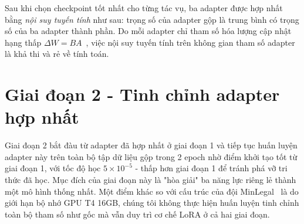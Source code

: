 Sau khi chọn checkpoint tốt nhất cho từng tác vụ, ba adapter được hợp nhất bằng \emph{nội suy tuyến tính} như sau: trọng số của adapter gộp là trung bình có trọng số của ba adapter thành phần. Do mỗi adapter chỉ tham số hóa lượng cập nhật hạng thấp $\Delta W = BA$~\cite{hu2022lora}, việc nội suy tuyến tính trên không gian tham số adapter là khả thi và rẻ về tính toán.

\section{Giai đoạn 2 - Tinh chỉnh adapter hợp nhất}

Giai đoạn 2 bắt đàu từ adapter đã hợp nhất ở giai đoạn 1 và tiếp tục huấn luyện adapter này trên toàn bộ tập dữ liệu gộp trong 2 epoch nhờ điểm khởi tạo tốt từ giai đoạn 1, với tốc độ học $5 \times 10^{-5}$ - thấp hơn giai đoạn 1 để tránh phá vỡ tri thức đã học. Mục đích của giai đoạn này là "hòa giải" ba năng lực riêng lẻ thành một mô hình thống nhất. Một điểm khác so với cấu trúc của đội MinLegal~\cite{luan2025minlegal} là do giới hạn bộ nhớ GPU T4 16GB, chúng tôi không thực hiện huấn luyện tinh chỉnh toàn bộ tham số như gốc mà vẫn duy trì cơ chế LoRA ở cả hai giai đoạn.
